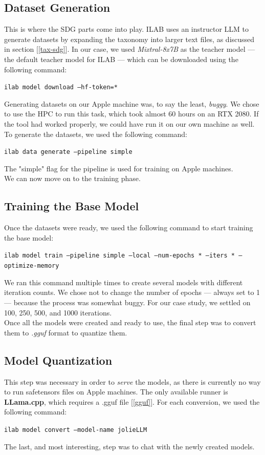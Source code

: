 \documentclass[12pt]{article}
\begin{document}
\subsection{Dataset Generation}
This is where the SDG parts come into play. ILAB uses an instructor LLM to generate datasets by expanding the taxonomy into larger text files, as discussed in section [\ref{tax-sdg}]. In our case, we used \textit{Mixtral-8x7B} as the teacher model — the default teacher model for ILAB — which can be downloaded using the following command:
\begin{center}
    \texttt{ilab model download --hf-token=*}
\end{center}
Generating datasets on our Apple machine was, to say the least, \textit{buggy}. We chose to use the HPC to run this task, which took almost 60 hours on an RTX 2080. If the tool had worked properly, we could have run it on our own machine as well.\\
To generate the datasets, we used the following command:
\begin{center}
    \texttt{ilab data generate --pipeline simple}
\end{center}
The "simple" flag for the pipeline is used for training on Apple machines.\vspace{14pt}\\
We can now move on to the training phase.

\subsection{Training the Base Model}
Once the datasets were ready, we used the following command to start training the base model:
\begin{center}
    \texttt{ilab model train --pipeline simple --local --num-epochs * --iters * --optimize-memory}
\end{center}
We ran this command multiple times to create several models with different iteration counts. We chose not to change the number of epochs — always set to 1 — because the process was somewhat buggy. For our case study, we settled on 100, 250, 500, and 1000 iterations.\vspace{14pt}\\
Once all the models were created and ready to use, the final step was to convert them to \textit{.gguf} format to quantize them.

\subsection{Model Quantization}
This step was necessary in order to \textit{serve} the models, as there is currently no way to run safetensors files on Apple machines. The only available runner is \textbf{LLama.cpp}, which requires a .gguf file [\ref{gguf}]. For each conversion, we used the following command:
\begin{center}
    \texttt{ilab model convert --model-name jolieLLM}
\end{center}
The last, and most interesting, step was to chat with the newly created models.
\end{document}
